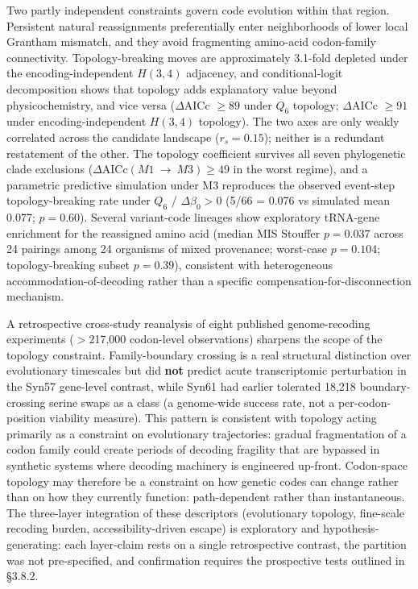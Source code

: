 \documentclass[preprint,11pt,authoryear,a4paper]{elsarticle}
\begin{document}
Two partly independent constraints govern code evolution within that
region. Persistent natural reassignments preferentially enter
neighborhoods of lower local Grantham mismatch, and they avoid
fragmenting amino-acid codon-family connectivity. Topology-breaking
moves are approximately 3.1-fold depleted under the encoding-independent
\(H(3,4)\) adjacency, and conditional-logit decomposition shows that
topology adds explanatory value beyond physicochemistry, and vice versa
(\(\Delta\text{AICc } \geq 89\) under \(Q_{6}\) topology;
\(\Delta\text{AICc } \geq 91\) under encoding-independent \(H(3,4)\)
topology). The two axes are only weakly correlated across the candidate
landscape (\(r_{s} = 0.15\)); neither is a redundant restatement of the
other. The topology coefficient survives all seven phylogenetic clade
exclusions (\(\Delta\text{AICc}(M1\  \rightarrow \ M3) \geq 49\) in the
worst regime), and a parametric predictive simulation under M3
reproduces the observed event-step topology-breaking rate under
\(Q_{6}\) / \(\Delta\beta_{0} > 0\) (5/66 = 0.076 vs simulated mean
0.077; \(p = 0.60\)). Several variant-code lineages show exploratory
tRNA-gene enrichment for the reassigned amino acid (median MIS Stouffer
\(p = 0.037\) across 24 pairings among 24 organisms of mixed provenance;
worst-case \(p = 0.104\); topology-breaking subset \(p = 0.39\)),
consistent with heterogeneous accommodation-of-decoding rather than a
specific compensation-for-disconnection mechanism.

A retrospective cross-study reanalysis of eight published
genome-recoding experiments (\(>\)217,000 codon-level observations)
sharpens the scope of the topology constraint. Family-boundary crossing
is a real structural distinction over evolutionary timescales but did
\textbf{not} predict acute transcriptomic perturbation in the Syn57
gene-level contrast, while Syn61 had earlier tolerated 18,218
boundary-crossing serine swaps as a class \citep{fredens2019} (a
genome-wide success rate, not a per-codon-position viability measure).
This pattern is consistent with topology acting primarily as a
constraint on evolutionary trajectories: gradual fragmentation of a
codon family could create periods of decoding fragility that are
bypassed in synthetic systems where decoding machinery is engineered
up-front. Codon-space topology may therefore be a constraint on how
genetic codes can change rather than on how they currently function:
path-dependent rather than instantaneous. The three-layer integration of
these descriptors (evolutionary topology, fine-scale recoding burden,
accessibility-driven escape) is exploratory and hypothesis-generating:
each layer-claim rests on a single retrospective contrast, the partition
was not pre-specified, and confirmation requires the prospective tests
outlined in §3.8.2.
\end{document}
